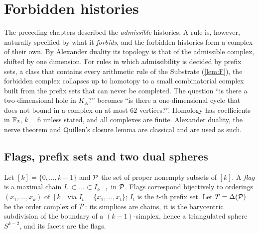 \chapter{Forbidden histories}\label{ch:duality}

The preceding chapters described the \emph{admissible} histories. A rule is, however, naturally specified by what it \emph{forbids}, and the forbidden histories form a complex of their own. By Alexander duality its topology is that of the admissible complex, shifted by one dimension. For rules in which admissibility is decided by prefix sets, a class that contains every arithmetic rule of the Substrate (\cref{lem:F}), the forbidden complex collapses up to homotopy to a small combinatorial complex built from the prefix sets that can never be completed. The question ``is there a two-dimensional hole in $K_A$?'' becomes ``is there a one-dimensional cycle that does not bound in a complex on at most $62$ vertices?''. Homology has coefficients in $\mathbb{F}_2$, $k=6$ unless stated, and all complexes are finite. Alexander duality, the nerve theorem and Quillen's closure lemma are classical and are used as such.

\section{Flags, prefix sets and two dual spheres}\label{sec:flags}
Let $[k]=\{0,\dots,k-1\}$ and $\mathcal{P}$ the set of proper nonempty subsets of $[k]$. A \emph{flag} is a maximal chain $I_1\subset\dots\subset I_{k-1}$ in $\mathcal{P}$. Flags correspond bijectively to orderings $(x_1,\dots,x_k)$ of $[k]$ via $I_t=\{x_1,\dots,x_t\}$; $I_t$ is the $t$-th prefix set. Let $T=\Delta(\mathcal{P})$ be the order complex of $\mathcal{P}$: its simplices are chains, it is the barycentric subdivision of the boundary of a $(k{-}1)$-simplex, hence a triangulated sphere $S^{k-2}$, and its facets are the flags.

